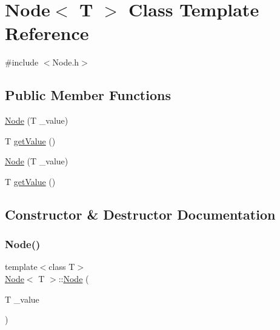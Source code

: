 \hypertarget{classNode}{}\section{Node$<$ T $>$ Class Template Reference}
\label{classNode}


{\ttfamily \#include $<$Node.\+h$>$}

\subsection*{Public Member Functions}
\begin{DoxyCompactItemize}
\item 
\mbox{\hyperlink{classNode_ab21d6b5819c46310ce96e24a1db978ec}{Node}} (T \+\_\+value)
\item 
T \mbox{\hyperlink{classNode_a8a9d6500c263a8338c1b763f44f8dadd}{get\+Value}} ()
\item 
\mbox{\hyperlink{classNode_ab21d6b5819c46310ce96e24a1db978ec}{Node}} (T \+\_\+value)
\item 
T \mbox{\hyperlink{classNode_a8a9d6500c263a8338c1b763f44f8dadd}{get\+Value}} ()
\end{DoxyCompactItemize}


\subsection{Constructor \& Destructor Documentation}
\mbox{\label{classNode_ab21d6b5819c46310ce96e24a1db978ec}} 
\subsubsection{\texorpdfstring{Node()}{Node()}\hspace{0.1cm}{\footnotesize\ttfamily [1/2]}}
{\footnotesize\ttfamily template$<$class T$>$ \\
\mbox{\hyperlink{classNode}{Node}}$<$ T $>$\+::\mbox{\hyperlink{classNode}{Node}} (\begin{DoxyParamCaption}\item[{T}]{\+\_\+value }\end{DoxyParamCaption})}

\mbox{\label{classNode_ab21d6b5819c46310ce96e24a1db978ec}} 
